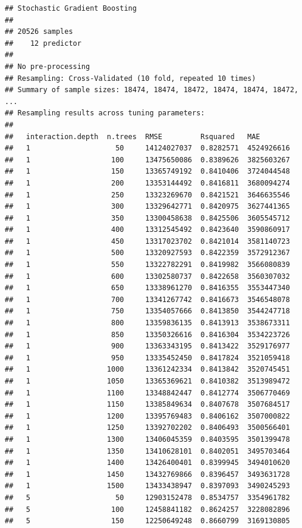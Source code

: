 \documentclass[11pt,]{article}
\begin{document}
\begin{verbatim}
## Stochastic Gradient Boosting 
## 
## 20526 samples
##    12 predictor
## 
## No pre-processing
## Resampling: Cross-Validated (10 fold, repeated 10 times) 
## Summary of sample sizes: 18474, 18474, 18472, 18474, 18474, 18472, ... 
## Resampling results across tuning parameters:
## 
##   interaction.depth  n.trees  RMSE         Rsquared   MAE       
##   1                    50     14124027037  0.8282571  4524926616
##   1                   100     13475650086  0.8389626  3825603267
##   1                   150     13365749192  0.8410406  3724044548
##   1                   200     13353144492  0.8416811  3680094274
##   1                   250     13323269670  0.8421521  3646635546
##   1                   300     13329642771  0.8420975  3627441365
##   1                   350     13300458638  0.8425506  3605545712
##   1                   400     13312545492  0.8423640  3590860917
##   1                   450     13317023702  0.8421014  3581140723
##   1                   500     13320927593  0.8422359  3572912367
##   1                   550     13322782291  0.8419982  3566080839
##   1                   600     13302580737  0.8422658  3560307032
##   1                   650     13338961270  0.8416355  3553447340
##   1                   700     13341267742  0.8416673  3546548078
##   1                   750     13354057666  0.8413850  3544247718
##   1                   800     13359836135  0.8413913  3538673311
##   1                   850     13350326616  0.8416304  3534223726
##   1                   900     13363343195  0.8413422  3529176977
##   1                   950     13335452450  0.8417824  3521059418
##   1                  1000     13361242334  0.8413842  3520745451
##   1                  1050     13365369621  0.8410382  3513989472
##   1                  1100     13348842447  0.8412774  3506770469
##   1                  1150     13385849634  0.8407678  3507684517
##   1                  1200     13395769483  0.8406162  3507000822
##   1                  1250     13392702202  0.8406493  3500566401
##   1                  1300     13406045359  0.8403595  3501399478
##   1                  1350     13410628101  0.8402051  3495703464
##   1                  1400     13426400401  0.8399945  3494010620
##   1                  1450     13432769866  0.8396457  3493631728
##   1                  1500     13433438947  0.8397093  3490245293
##   5                    50     12903152478  0.8534757  3354961782
##   5                   100     12458841182  0.8624257  3228082896
##   5                   150     12250649248  0.8660799  3169130805

\end{verbatim}
\end{document}
